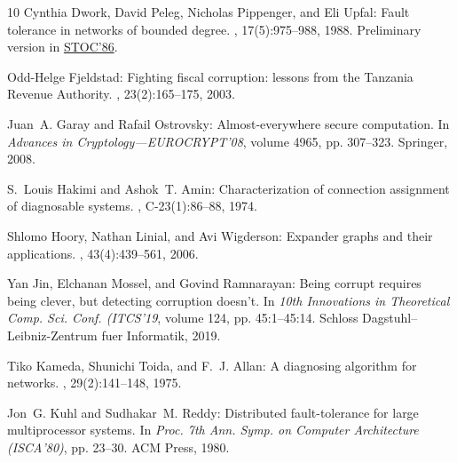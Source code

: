 \documentclass[11pt]{article}
\numberwithin{equation}{section}
\theoremstyle{definition}
\theoremstyle{plain}
\begin{document}
\begin{thebibliography}{10}
{\sc Cynthia Dwork, David Peleg, Nicholas Pippenger, and Eli Upfal}: Fault
  tolerance in networks of bounded degree.
, 17(5):975--988, 1988.
\newblock Preliminary version in
  \href{https://doi.org/10.1145/12130.12169}{STOC'86}.
\newblock [\epfmtdoi{10.1137/0217061}]

{\sc Odd-Helge Fjeldstad}: Fighting fiscal corruption: lessons from the
  {Tanzania Revenue Authority}.
, 23(2):165--175, 2003.

{\sc Juan~A. Garay and Rafail Ostrovsky}: Almost-everywhere secure computation.
\newblock In {\em Advances in Cryptology---{EUROCRYPT'08}}, volume 4965, pp.
  307--323. Springer, 2008.
\newblock [\epfmtdoi{10.1007/978-3-540-78967-3\_18}]

{\sc S.~Louis Hakimi and Ashok~T. Amin}: Characterization of connection
  assignment of diagnosable systems.
, C-23(1):86--88, 1974.
\newblock [\epfmtdoi{10.1109/t-c.1974.223782}]

{\sc Shlomo Hoory, Nathan Linial, and Avi Wigderson}: Expander graphs and their
  applications.
, 43(4):439--561, 2006.
\newblock [\epfmtdoi{10.1090/S0273-0979-06-01126-8}]

{\sc Yan Jin, Elchanan Mossel, and Govind Ramnarayan}: Being corrupt requires
  being clever, but detecting corruption doesn't.
\newblock In {\em 10th Innovations in Theoretical Comp. Sci. Conf. (ITCS'19},
  volume 124, pp. 45:1--45:14. Schloss Dagstuhl--Leibniz-Zentrum fuer
  Informatik, 2019.

{\sc Tiko Kameda, Shunichi Toida, and F.~J. Allan}: A diagnosing algorithm for
  networks.
, 29(2):141--148, 1975.
\newblock [\epfmtdoi{10.1016/S0019-9958(75)90508-2}]

{\sc Jon~G. Kuhl and Sudhakar~M. Reddy}: Distributed fault-tolerance for large
  multiprocessor systems.
\newblock In {\em Proc. 7th Ann. Symp. on Computer Architecture (ISCA'80)}, pp.
  23--30. ACM Press, 1980.
\newblock [\epfmtdoi{10.1145/800053.801905}]


\end{thebibliography}
\end{document}
